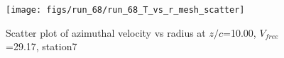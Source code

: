\begin{figure}[H]
\centering
\texttt{[image: figs/run\_68/run\_68\_T\_vs\_r\_mesh\_scatter]}
\caption{Scatter plot of azimuthal velocity vs radius at $z/c$=10.00, $V_{free}$=29.17, station7}
\label{fig:run_68_T_vs_r_mesh_scatter}
\end{figure}


